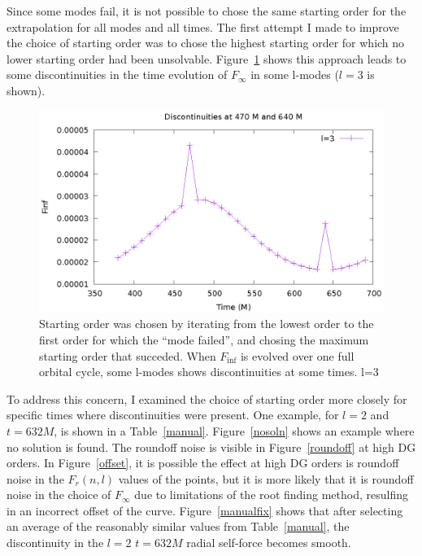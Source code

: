 Since some modes fail, it is not possible to chose the same starting order for the extrapolation for all modes and all times. The first attempt I made to improve the choice of starting order was to chose the highest starting order for which no lower starting order had been unsolvable. Figure~\ref{finfovertimediscont} shows this approach leads to some discontinuities in the time evolution of $F_{\infty}$ in some l-modes ($l=3$ is shown). 





\begin{figure}
  \includegraphics{finfovertimel3discontinuities}
  \caption{Starting order was chosen by iterating from the lowest order to the first order for which the ``mode failed'', and chosing the maximum starting order that succeded. When $F_{\inf}$ is evolved over one full orbital cycle, some l-modes shows discontinuities at some times. l=3}
\label{finfovertimediscont}
\end{figure}

To address this concern, I examined the choice of starting order more closely for specific times where discontinuities were present. One example, for $l=2$ and $t=632M$, is shown in a Table~\ref{manual}. Figure~\ref{nosoln} shows an example where no solution is found. The roundoff noise is visible in Figure~\ref{roundoff} at high DG orders. In Figure~\ref{offset}, it is possible the effect at high DG orders is roundoff noise in the $F_r(n,l)$ values of the points, but it is more likely that it is roundoff noise in the choice of $F_\infty$ due to limitations of the root finding method, resulfing in an incorrect offset of the curve. Figure~\ref{manualfix} shows that after selecting an average of the reasonably similar values from Table~\ref{manual}, the discontinuity in the $l=2$ $t=632M$ radial self-force becomes smooth. 


